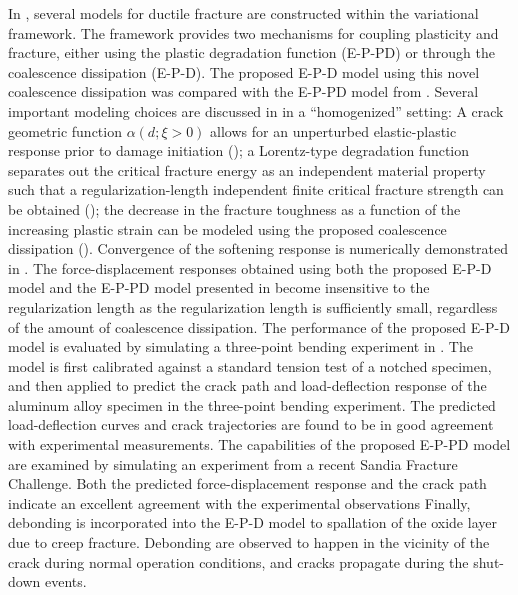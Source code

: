 In , several models for ductile fracture are constructed within the variational framework. The framework provides two mechanisms for coupling  plasticity and fracture, either using the plastic degradation function (E-P-PD) or through the coalescence dissipation (E-P-D). The proposed E-P-D model using this novel coalescence dissipation was compared with the E-P-PD model from \cite{brandon2020cohesive}.
Several important modeling choices are discussed in  in a ``homogenized'' setting:
A crack geometric function $\alpha(d; \xi > 0)$ allows for an unperturbed elastic-plastic response prior to damage initiation ();
a Lorentz-type degradation function separates out the critical fracture energy as an independent material property such that a regularization-length independent finite critical fracture strength can be obtained ();
the decrease in the fracture toughness as a function of the increasing plastic strain can be modeled using the proposed coalescence dissipation ().
Convergence of the softening response is numerically demonstrated in .
The force-displacement responses obtained using both the proposed E-P-D model and the E-P-PD model presented in \cite{brandon2020cohesive} become insensitive to the regularization length as the regularization length is sufficiently small, regardless of the amount of coalescence dissipation.
The performance of the proposed E-P-D model is evaluated by simulating a three-point bending experiment in . The model is first calibrated against a standard tension test of a notched specimen, and then applied to predict the crack path and load-deflection response of the aluminum alloy specimen in the three-point bending experiment.
The predicted load-deflection curves and crack trajectories are found to be in good agreement with experimental measurements. The capabilities of the proposed E-P-PD model are examined by simulating an experiment from a recent Sandia Fracture Challenge. Both the predicted force-displacement response and the crack path indicate an excellent agreement with the experimental observations
Finally, debonding is incorporated into the E-P-D model to spallation of the oxide layer due to creep fracture. Debonding are observed to happen in the vicinity of the crack during normal operation conditions, and cracks propagate during the shut-down events. 

